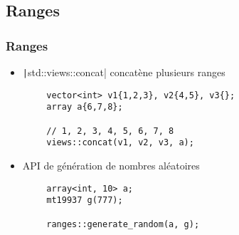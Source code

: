 \documentclass[C++.tex]{subfiles}
\begin{document}
\subsection*{Ranges}
\begin{frame}[fragile]
	\frametitle{Ranges}
	\begin{itemize}
		\item \texttt|std::views::concat| concatène plusieurs ranges
	\end{itemize}

	\begin{verbatim}
		vector<int> v1{1,2,3}, v2{4,5}, v3{};
		array a{6,7,8};

		// 1, 2, 3, 4, 5, 6, 7, 8
		views::concat(v1, v2, v3, a);
	\end{verbatim}

	\begin{itemize}
		\item API de génération de nombres aléatoires
	\end{itemize}

	\begin{verbatim}
		array<int, 10> a;
		mt19937 g(777);

		ranges::generate_random(a, g);
	\end{verbatim}


\end{frame}
\end{document}

